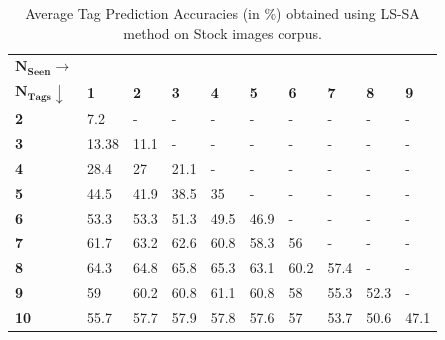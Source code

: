 \begin{table}[!htp]
\fontsize{8pt}{1em}\selectfont
\begin{center}
\caption{Average Tag Prediction Accuracies (in \%) obtained using LS-SA method on Stock images corpus.}
\label{tab:TPGWS30LSSA}
\begin{tabular}{|p{1.5cm}|p{0.5cm}|p{0.5cm}|p{0.5cm}|p{0.5cm}|p{0.5cm}|p{0.5cm}|p{0.5cm}|p{0.5cm}|p{0.5cm}|}
		\hline
		{$\boldsymbol{N_{Seen} \rightarrow}$} & &  &  &  & &  &  &  &\\ 
		{$\boldsymbol{N_{Tags}}\downarrow $} & \textbf{1} & \textbf{2} & \textbf{3} & \textbf{4} & \textbf{5}  & \textbf{6} & \textbf{7} & \textbf{8} & \textbf{9} \\ 
		\hline 		
		\textbf{2} & 7.2&-&-&-&-&-&-&-&- \\
		\hline
		\textbf{3} & 13.38&11.1&-&-&-&-&-&-&- \\ 
		\hline
		\textbf{4} & 28.4&27&21.1&-&-&-&-&-&- \\
		\hline
		\textbf{5} & 44.5&41.9&38.5&35&-&-&-&-&- \\
		\hline
		\textbf{6} & 53.3&53.3&51.3&49.5&46.9&-&-&-&- \\
		\hline
		\textbf{7} & 61.7&63.2&62.6&60.8&58.3&56&-&-&- \\
		\hline
		\textbf{8} & 64.3&64.8&65.8&65.3&63.1&60.2&57.4&-&- \\
		\hline
		\textbf{9} & 59&60.2&60.8&61.1&60.8&58&55.3&52.3&- \\
		\hline
		\textbf{10} & 55.7&57.7&57.9&57.8&57.6&57&53.7&50.6&47.1 \\
		\hline
\end{tabular}
\vspace{-2.5mm}
\end{center}
\end{table}

